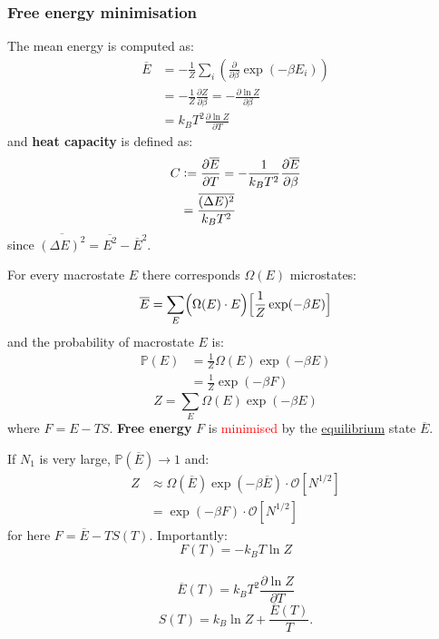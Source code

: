 \documentclass{article}
\newcommand{\deq}{\vcentcolon=}
\begin{document}
\begin{multicols*}{3}
\subsubsection*{Free energy minimisation}
The mean energy is computed as:
\begin{align*}
    \overline{E}
    &=-\frac{1}{Z}\sum_i\left(\frac{\partial}{\partial\beta}
    \exp(-\beta E_i)\right) \\
    &=-\frac{1}{Z}\frac{\partial Z}{\partial\beta}
    =-\frac{\partial\ln Z}{\partial\beta} \\
    &=k_B T^2\frac{\partial\ln Z}{\partial T}
\end{align*}
and \textbf{heat capacity} is defined as:
\begin{align*}
    C
    &\deq\frac{\partial\overline{E}}{\partial T}
    =-\frac{1}{k_B T^2}
    \frac{\partial\overline{E}}{\partial\beta} \\
    &=\frac{\overline{(\Delta E)^2}}{k_B T^2}
\end{align*}
since $\overline{(\Delta E)^2}=\overline{E^2}
-\overline{E}^2$.

For every macrostate $E$ 
there corresponds $\Omega(E)$ microstates:
$$\overline{E}=\sum_{E}\Bigl(\Omega(E)\cdot E\Bigr)
\Bigl[\frac{1}{Z}\exp(-\beta E)\Bigr]$$
and the probability of macrostate $E$ is:
\begin{align*}
    \mathbb{P}(E)
    &=\frac{1}{Z}\Omega(E)\exp(-\beta E) \\
    &=\frac{1}{Z}\exp(-\beta F)
\end{align*}
$$Z=\sum_E\Omega(E)\exp(-\beta E)$$
where $F=E-TS$. \textbf{Free energy} $F$ is
\textcolor{red}{minimised} by the
\underline{equilibrium} state $\overline{E}$.

If $N_1$ is very large, $\mathbb{P}(\overline{E})\rightarrow1$ and:
\begin{align*}
    Z
    &\approx\Omega(\overline{E})\exp(-\beta\overline{E})
    \cdot\mathcal{O}[N^{1/2}] \\
    &=\exp(-\beta F)\cdot\mathcal{O}[N^{1/2}]
\end{align*}
for here $F=\overline{E}-T S(T)$. Importantly:
$$F(T)=-k_B T\ln Z$$\
$$\overline{E}(T)=k_B T^2\frac{\partial\ln Z}{\partial T}$$
$$S(T)=k_B\ln Z+\frac{\overline{E}(T)}{T}.$$


\end{multicols*}
\end{document}
